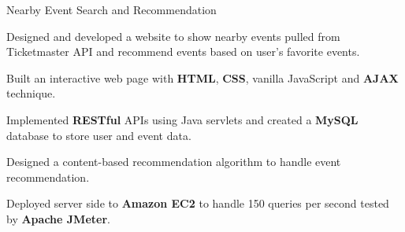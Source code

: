 \begin{cvsimpleprojects}
    \cvsimpleproject
    {Nearby Event Search and Recommendation}
    {
      \begin{cvitems}
        \item {Designed and developed a website to show nearby events pulled from Ticketmaster API and recommend events based on user’s favorite events.}
        \item {Built an interactive web page with \textbf{HTML}, \textbf{CSS}, vanilla JavaScript and \textbf{AJAX} technique.}
        \item {Implemented \textbf{RESTful} APIs using Java servlets and created a \textbf{MySQL} database to store user and event data.}
        \item {Designed a content-based recommendation algorithm to handle event recommendation.}
        \item {Deployed server side to \textbf{Amazon EC2} to handle 150 queries per second tested by \textbf{Apache JMeter}.}
      \end{cvitems}
    }
    
    

    
 
\end{cvsimpleprojects}
